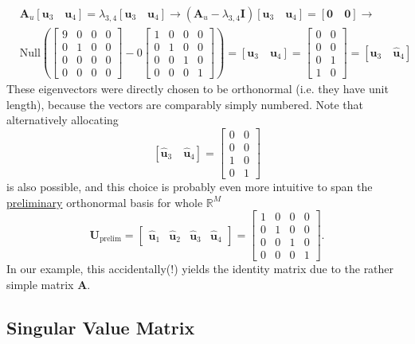 \documentclass[a4paper, 11pt]{scrartcl}
\begin{document}
\begin{align*}
&\bm{A}_u [\bm{u}_3 \quad \bm{u}_4] = \lambda_{3,4} [\bm{u}_3\quad\bm{u}_4]
\rightarrow
(\bm{A}_u - \lambda_{3,4} \bm{I}) [\bm{u}_3\quad\bm{u}_4] = [\bm{0} \quad \bm{0}]
\rightarrow\\
&\text{Null}\left(
\begin{bmatrix}
9 & 0 & 0 & 0\\
0 & 1 & 0 & 0\\
0 & 0 & 0 & 0\\
0 & 0 & 0 & 0
\end{bmatrix}
-
0
\begin{bmatrix}
1 & 0 & 0 & 0\\
0 & 1 & 0 & 0\\
0 & 0 & 1 & 0\\
0 & 0 & 0 & 1
\end{bmatrix}
\right)
= [\bm{u}_3 \quad \bm{u}_4] =
\begin{bmatrix}
0 & 0\\0 & 0\\0 & 1\\1 & 0
\end{bmatrix}
=
[\hat{\bm{u}}_3 \quad \hat{\bm{u}}_4]
\end{align*}
These eigenvectors were directly chosen to be orthonormal (i.e. they have unit length), because the vectors are comparably simply numbered. Note that alternatively allocating
$$[\hat{\bm{u}}_3 \quad \hat{\bm{u}}_4] =
\begin{bmatrix}
0 & 0\\
0 & 0\\
1 & 0\\
0 & 1
\end{bmatrix}
$$
is also possible, and this choice is probably even more intuitive to span the \underline{preliminary} orthonormal basis for whole $\mathbb{R}^M$
$$
\bm{U}_\text{prelim}
=
\begin{bmatrix}
\hat{\bm{u}}_1 & \hat{\bm{u}}_2 &\hat{\bm{u}}_3 & \hat{\bm{u}}_4
\end{bmatrix}
=
\begin{bmatrix}
1 & 0 & 0 & 0\\
0 & 1 & 0 & 0\\
0 & 0 & 1 & 0\\
0 & 0 & 0 & 1
\end{bmatrix}.
$$
In our example, this accidentally(!) yields the identity matrix due to the rather simple matrix $\bm{A}$.

\subsection{Singular Value Matrix}
\end{document}
